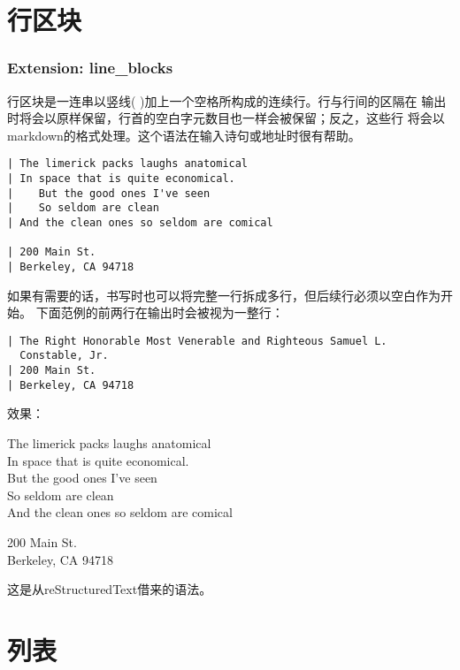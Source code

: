 \documentclass[fancyhdr,bookmark]{ctexbook}
\begin{document}
\section{行区块}\label{ux884cux533aux5757}

\subsubsection{Extension: line\_blocks}\label{extension-lineux5fblocks}

行区块是一连串以竖线(
\textbar{})加上一个空格所构成的连续行。行与行间的区隔在
输出时将会以原样保留，行首的空白字元数目也一样会被保留；反之，这些行
将会以markdown的格式处理。这个语法在输入诗句或地址时很有帮助。

\begin{lstlisting}
| The limerick packs laughs anatomical
| In space that is quite economical.
|    But the good ones I've seen
|    So seldom are clean
| And the clean ones so seldom are comical

| 200 Main St.
| Berkeley, CA 94718
\end{lstlisting}

如果有需要的话，书写时也可以将完整一行拆成多行，但后续行必须以空白作为开始。
下面范例的前两行在输出时会被视为一整行：

\begin{lstlisting}
| The Right Honorable Most Venerable and Righteous Samuel L.
  Constable, Jr.
| 200 Main St.
| Berkeley, CA 94718
\end{lstlisting}

效果：

The limerick packs laughs anatomical\\In space that is quite
economical.\\\hspace*{0.333em}\hspace*{0.333em}\hspace*{0.333em}But the
good ones I've
seen\\\hspace*{0.333em}\hspace*{0.333em}\hspace*{0.333em}So seldom are
clean\\And the clean ones so seldom are comical

200 Main St.\\Berkeley, CA 94718

这是从reStructuredText借来的语法。

\section{列表}\label{ux5217ux8868}
\end{document}
